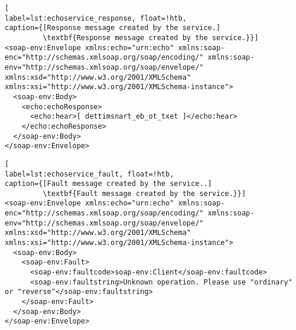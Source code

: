 \begin{lstlisting}[
label=lst:echoservice_response, float=!htb,
caption={[Response message created by the service.]
         \textbf{Response message created by the service.}}]
<soap-env:Envelope xmlns:echo="urn:echo" xmlns:soap-enc="http://schemas.xmlsoap.org/soap/encoding/" xmlns:soap-env="http://schemas.xmlsoap.org/soap/envelope/" xmlns:xsd="http://www.w3.org/2001/XMLSchema" xmlns:xsi="http://www.w3.org/2001/XMLSchema-instance">
  <soap-env:Body>
    <echo:echoResponse>
      <echo:hear>[ dettimsnart_eb_ot_txet ]</echo:hear>
    </echo:echoResponse>
  </soap-env:Body>
</soap-env:Envelope>
\end{lstlisting}


\begin{lstlisting}[
label=lst:echoservice_fault, float=!htb,
caption={[Fault message created by the service..]
         \textbf{Fault message created by the service.}}]
<soap-env:Envelope xmlns:echo="urn:echo" xmlns:soap-enc="http://schemas.xmlsoap.org/soap/encoding/" xmlns:soap-env="http://schemas.xmlsoap.org/soap/envelope/" xmlns:xsd="http://www.w3.org/2001/XMLSchema" xmlns:xsi="http://www.w3.org/2001/XMLSchema-instance">
  <soap-env:Body>
    <soap-env:Fault>
      <soap-env:faultcode>soap-env:Client</soap-env:faultcode>
      <soap-env:faultstring>Unknown operation. Please use "ordinary" or "reverse"</soap-env:faultstring>
    </soap-env:Fault>
  </soap-env:Body>
</soap-env:Envelope>
\end{lstlisting}






